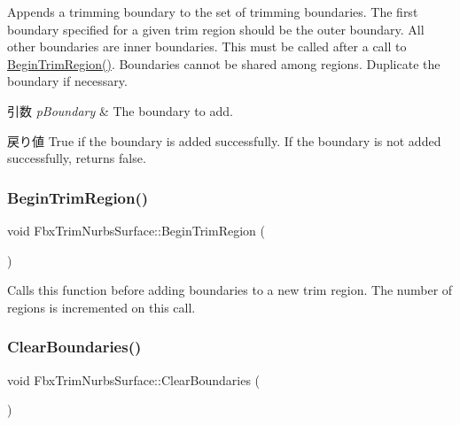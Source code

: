 Appends a trimming boundary to the set of trimming boundaries. The first boundary specified for a given trim region should be the outer boundary. All other boundaries are inner boundaries. This must be called after a call to \hyperlink{class_fbx_trim_nurbs_surface_aaec68af89d01b7f4bd76c2ec5e3eb837}{Begin\+Trim\+Region()}. Boundaries cannot be shared among regions. Duplicate the boundary if necessary. 
\begin{DoxyParams}{引数}
{\em p\+Boundary} & The boundary to add. \\
\hline
\end{DoxyParams}
\begin{DoxyReturn}{戻り値}
{\ttfamily True} if the boundary is added successfully. If the boundary is not added successfully, returns {\ttfamily false}. 
\end{DoxyReturn}
\mbox{\label{class_fbx_trim_nurbs_surface_aaec68af89d01b7f4bd76c2ec5e3eb837}} 
\subsubsection{\texorpdfstring{Begin\+Trim\+Region()}{BeginTrimRegion()}}
{\footnotesize\ttfamily void Fbx\+Trim\+Nurbs\+Surface\+::\+Begin\+Trim\+Region (\begin{DoxyParamCaption}{ }\end{DoxyParamCaption})}

Calls this function before adding boundaries to a new trim region. The number of regions is incremented on this call. \mbox{\label{class_fbx_trim_nurbs_surface_a9b06224c2a2f1601a88a3e26f6060cab}} 
\subsubsection{\texorpdfstring{Clear\+Boundaries()}{ClearBoundaries()}}
{\footnotesize\ttfamily void Fbx\+Trim\+Nurbs\+Surface\+::\+Clear\+Boundaries (\begin{DoxyParamCaption}{ }\end{DoxyParamCaption})}

